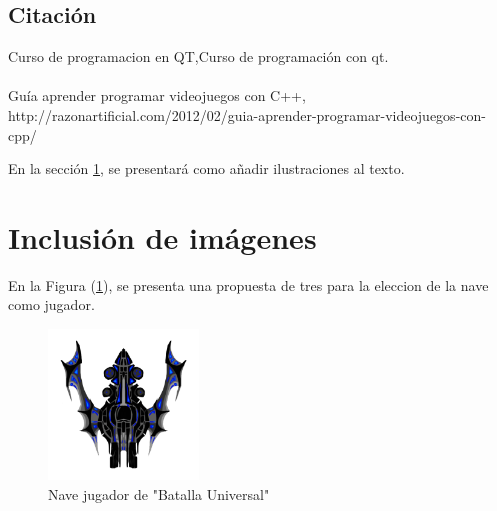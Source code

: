 \documentclass{article}
\begin{document}
\subsection{Citación}


Curso de programacion en QT,Curso de programación con qt.\\\\

Guía aprender programar videojuegos con C++, http://razonartificial.com/2012/02/guia-aprender-programar-videojuegos-con-cpp/



En la sección \ref{imagenes}, se presentará como añadir ilustraciones al texto.

\section{Inclusión de imágenes} \label{imagenes}

En la Figura (\ref{fig:cpplogo}), se presenta una propuesta de tres para la eleccion de la nave como jugador.

\begin{figure}[h]
\includegraphics[width=4cm]{Nave.png}
\centering
\caption{Nave jugador de "Batalla Universal"}
\label{fig:cpplogo}
\end{figure}





\end{document}
